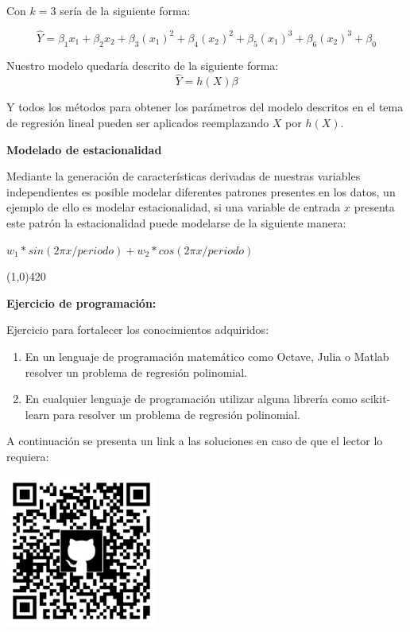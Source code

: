 \documentclass[11pt,fleqn]{book} %
\begin{document}
Con $k=3$ sería de la siguiente forma:

\begin{equation}
\label{eqn:linear_regression_mod2}
\hat{Y}  = \beta _1 x_1 + \beta _2 x_2 + \beta _3 (x_1)^2 + \beta _4 (x_2)^2 + \beta _5 (x_1)^3 + \beta _6 (x_2)^3 +\beta _0
\end{equation}

Nuestro modelo quedaría descrito de la siguiente forma:
\begin{equation}
\label{eqn:linear_regression_vec_mod3}
\hat{Y}  = h(X) \beta
\end{equation}

Y todos los métodos para obtener los parámetros del modelo descritos en el tema de regresión lineal pueden ser aplicados reemplazando $X$ por $h(X)$.

\textbf{Modelado de estacionalidad}

Mediante la generación de características derivadas de nuestras variables independientes es posible modelar diferentes patrones presentes en los datos, un ejemplo de ello es modelar estacionalidad, si una variable de entrada $x$ presenta este patrón la estacionalidad puede modelarse de la siguiente manera:

$w_1*sin(2\pi x/ periodo) + w_2*cos(2\pi x/ periodo)$



\begin{center}
\line(1,0){420}
\end{center}

\textbf{Ejercicio de programación:}

Ejercicio para fortalecer los conocimientos adquiridos:

\begin{enumerate}
\item En un lenguaje de programación matemático como Octave, Julia o Matlab resolver un problema de regresión polinomial.
\item En cualquier lenguaje de programación utilizar alguna librería como scikit-learn para resolver un problema de regresión polinomial.
\end{enumerate}

A continuación se presenta un link a las soluciones en caso de que el lector lo requiera:

\includegraphics[width=5cm]{Pictures/github/libro-ia.png}
\end{document}
